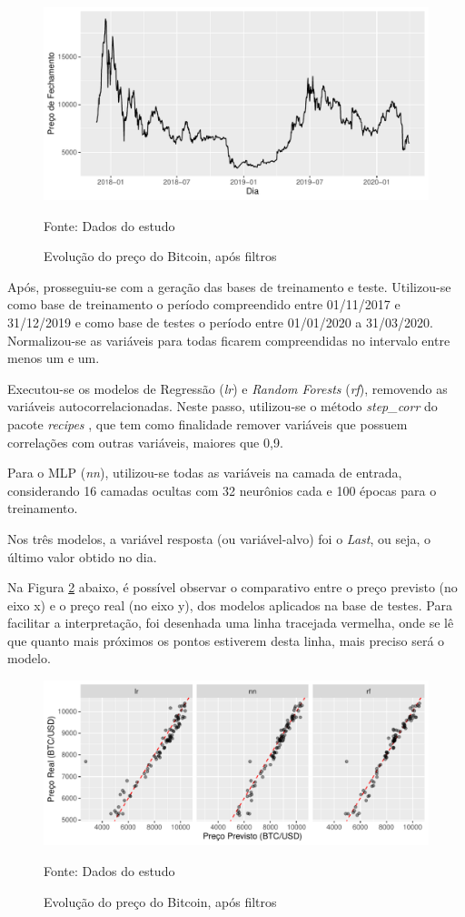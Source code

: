 \documentclass[12pt]{article}
\begin{document}
\begin{figure}[!ht]
  \centering
  \includegraphics[scale = 0.7]{img/dataset.pdf}
  \caption{Evolução do preço do Bitcoin, após filtros}
  Fonte: Dados do estudo
  \label{fig:dataset}
\end{figure}


Após, prosseguiu-se com a geração das bases de treinamento e teste. Utilizou-se 
como base de treinamento o período compreendido entre 01/11/2017 e 31/12/2019 e
como base de testes o período entre 01/01/2020 a 31/03/2020. Normalizou-se as 
variáveis para todas ficarem compreendidas no intervalo entre menos um e um. 

Executou-se os modelos de Regressão (\textit{lr}) e \textit{Random Forests} 
(\textit{rf}), removendo as variáveis autocorrelacionadas. Neste passo, utilizou-se 
o método \textit{step\_corr} do pacote \textit{recipes} \cite{recipes},
que tem como finalidade remover variáveis que possuem correlações com outras variáveis,
maiores que 0,9.

Para o MLP (\textit{nn}), utilizou-se todas as variáveis na camada de entrada, 
considerando 16 camadas ocultas com 32 neurônios cada e 100 épocas para o 
treinamento.

Nos três modelos, a variável resposta (ou variável-alvo) foi o \textit{Last}, 
ou seja, o último valor obtido no dia.

Na Figura \ref{fig:results_scatter} abaixo, é possível observar o comparativo
entre o preço previsto (no eixo x) e o preço real (no eixo y), dos modelos 
aplicados na base de testes. Para facilitar a interpretação, foi desenhada uma 
linha tracejada vermelha, onde se lê que quanto mais próximos os pontos estiverem
desta linha, mais preciso será o modelo.

\begin{figure}[!ht]
  \centering
  \includegraphics[scale = 0.8]{img/results_scatter.pdf}
  \caption{Evolução do preço do Bitcoin, após filtros}
  Fonte: Dados do estudo
  \label{fig:results_scatter}
\end{figure}
\end{document}
